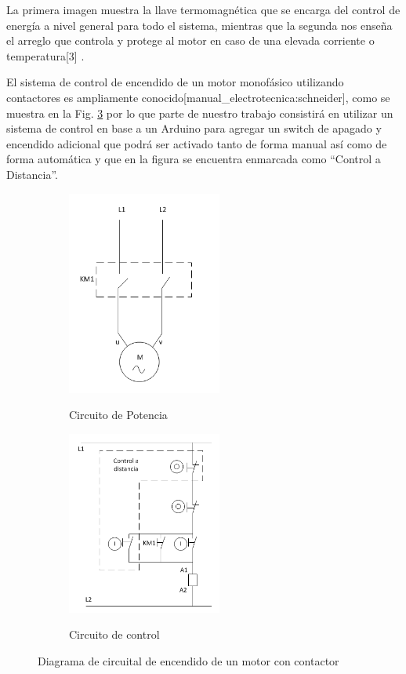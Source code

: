 \documentclass[main_conf.tex]{subfiles}
\begin{document}
La primera imagen muestra la llave termomagnética que se encarga del
control de energía a nivel general para todo el sistema, mientras que la
segunda nos enseña el arreglo que controla y protege al motor en caso de
una elevada corriente o temperatura[3] \cite{Motor_control:schneider}.

El sistema de control de encendido de un motor monofásico utilizando
contactores es ampliamente conocido[manual_electrotecnica:schneider],
como se muestra en la Fig. \ref{diag_control_on_off_motor} por lo que
parte de nuestro trabajo consistirá en utilizar un sistema de control en
base a un Arduino para agregar un switch de apagado y encendido adicional
que podrá ser activado tanto de forma manual así como de forma automática y
que en la figura se encuentra enmarcada como “Control a Distancia”.

\begin{figure}[t]
  \centering
  \begin{subfigure}[b]{0.5\textwidth}
    \centering
    \includegraphics[width=2.0in]{../img/caja_electrica/Circuito_de_potencia.png}
    \label{Circuito_de_potencia}
    \caption{Circuito de Potencia}
  \end{subfigure}

  \begin{subfigure}[b]{0.5\textwidth}
    \centering
    \includegraphics[width=2.0in]{../img/caja_electrica/Circuito_de_control.png}
    \label{Circuito_de_control}
    \caption{Circuito de control}
  \end{subfigure}

  \caption{Diagrama de circuital de encendido de un motor con contactor}
  \label{diag_control_on_off_motor}
\end{figure}
\end{document}
